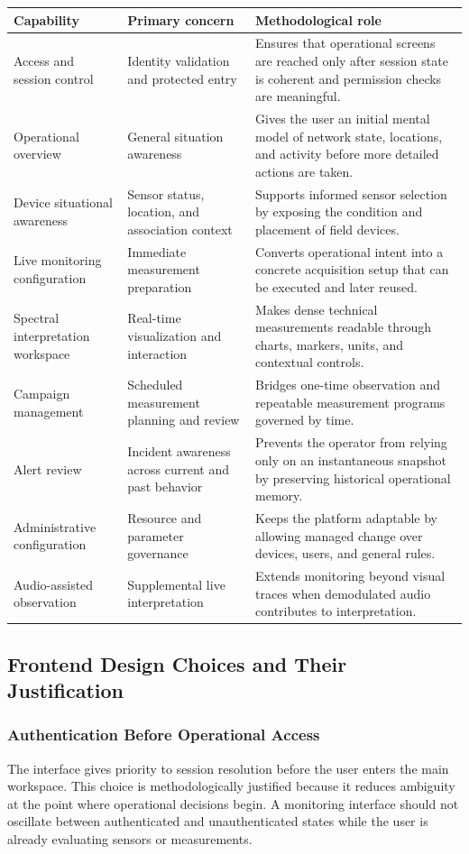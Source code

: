 \documentclass[11pt,a4paper]{article}
\begin{document}
\begin{longtable}{@{}p{}p{}p{}@{}}
\toprule
\textbf{Capability} & \textbf{Primary concern} & \textbf{Methodological role} \\
\midrule
\endhead
Access and session control & Identity validation and protected entry & Ensures that operational screens are reached only after session state is coherent and permission checks are meaningful. \\
Operational overview & General situation awareness & Gives the user an initial mental model of network state, locations, and activity before more detailed actions are taken. \\
Device situational awareness & Sensor status, location, and association context & Supports informed sensor selection by exposing the condition and placement of field devices. \\
Live monitoring configuration & Immediate measurement preparation & Converts operational intent into a concrete acquisition setup that can be executed and later reused. \\
Spectral interpretation workspace & Real-time visualization and interaction & Makes dense technical measurements readable through charts, markers, units, and contextual controls. \\
Campaign management & Scheduled measurement planning and review & Bridges one-time observation and repeatable measurement programs governed by time. \\
Alert review & Incident awareness across current and past behavior & Prevents the operator from relying only on an instantaneous snapshot by preserving historical operational memory. \\
Administrative configuration & Resource and parameter governance & Keeps the platform adaptable by allowing managed change over devices, users, and general rules. \\
Audio-assisted observation & Supplemental live interpretation & Extends monitoring beyond visual traces when demodulated audio contributes to interpretation. \\
\bottomrule
\end{longtable}

\subsection{Frontend Design Choices and Their Justification}
\subsubsection{Authentication Before Operational Access}
The interface gives priority to session resolution before the user enters the main workspace. This choice is methodologically justified because it reduces ambiguity at the point where operational decisions begin. A monitoring interface should not oscillate between authenticated and unauthenticated states while the user is already evaluating sensors or measurements.
\end{document}
